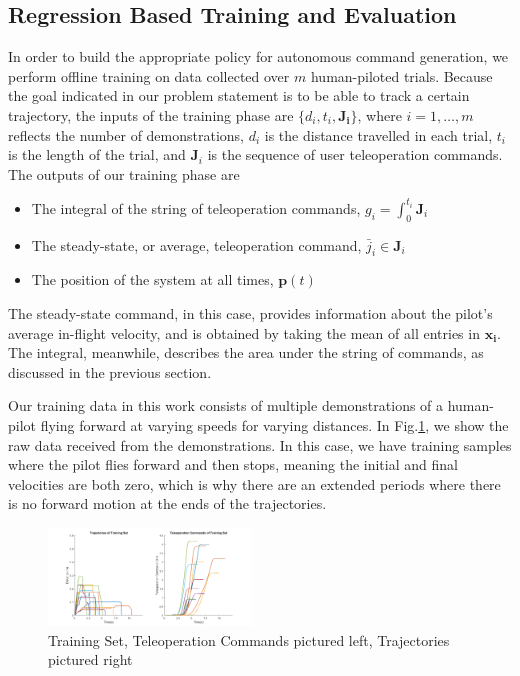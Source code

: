 \documentclass[letterpaper, 10 pt, conference]{ieeeconf}  %
\newcommand\NB[1]{$\spadesuit$\footnote{NB: #1}}
\begin{document}
\subsection{Regression Based Training and Evaluation} \label{sec:train}
In order to build the appropriate policy for autonomous command generation, we perform offline training on data collected over $m$ human-piloted trials. Because the goal indicated in our problem statement is to be able to track a certain trajectory, the inputs of the training phase are $\{d_i,t_i,\mathbf{J_i}\}$, where $i=1,\ldots,m$ reflects the number of demonstrations, %
$d_i$ is the distance travelled in each trial, $t_i$ is the length of the trial, and $\mathbf{J}_i$ is the sequence of user teleoperation commands. The outputs of our training phase are \begin{itemize}
    \item The integral of the string of teleoperation commands, $g_i = \int_0^{t_i}\mathbf{J}_i$
    \item The steady-state, or average, teleoperation command, $\bar{j}_i \in \mathbf{J}_i$
    \item The position of the system at all times, $\mathbf{p}(t)$
\end{itemize}
The steady-state command, in this case, provides information about the pilot's average in-flight velocity, and is obtained by taking the mean of all entries in $\mathbf{x_i}$. The integral, meanwhile, describes the area under the string of commands, as discussed in the previous section. %

Our training data in this work consists of multiple demonstrations of a human-pilot flying forward at varying speeds for varying distances. In Fig.\ref{fig:train}, we show the raw data received from the demonstrations. In this case, we have training samples where the pilot flies forward and then stops, meaning the initial and final velocities are both zero, which is why there are an extended periods where there is no forward motion at the ends of the trajectories.

\begin{figure}[ht]
    \includegraphics[width=0.48\textwidth]{images/training.png}
    \caption{Training Set, Teleoperation Commands pictured left, Trajectories pictured right}
    \label{fig:train}
\end{figure}
\end{document}
